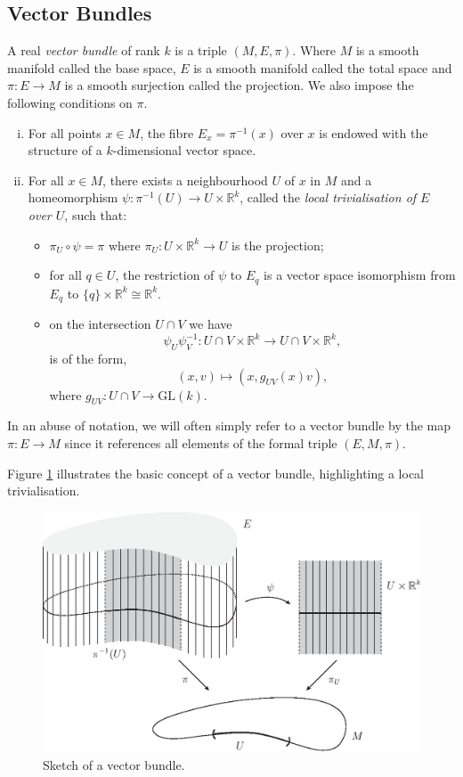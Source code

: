 \subsection{Vector Bundles}
\begin{definition}
A real \textit{vector bundle} of rank $k$ is a triple $(M,E,\pi)$. Where $M$ is a smooth manifold called the base space, $E$ is a smooth manifold called the total space and $\pi:E\to M$ is a smooth surjection called the projection. We also impose the following conditions on $\pi$.
\begin{enumerate}[(i)]
\item For all points $x\in M$, the fibre $E_x=\pi^{-1}(x)$ over $x$ is endowed with the structure of a $k$-dimensional vector space.
\item For all $x\in M$, there exists a neighbourhood $U$ of $x$ in $M$ and a homeomorphism $\psi:\pi^{-1}(U)\to U\times\mathbb{R}^k$, called the \textit{local trivialisation of $E$ over $U$}, such that:
\begin{itemize}
\item $\pi_U\circ\psi=\pi$ where $\pi_U:U\times\mathbb{R}^k\to U$ is the projection;
\item for all $q\in U$, the restriction of $\psi$ to $E_q$ is a vector space isomorphism from $E_q$ to $\{q\}\times\mathbb{R}^k\cong\mathbb{R}^k$.
\item on the intersection $U\cap V$ we have
\[
\psi_U\psi^{-1}_V:U\cap V\times\mathbb{R}^k\to U\cap V\times\mathbb{R}^k,
\]
is of the form,
\[
(x,v)\mapsto\left(x,g_{UV}(x)v\right),
\]
where $g_{UV}:U\cap V\to\mathrm{GL}(k)$.
\end{itemize}
\end{enumerate}
In an abuse of notation, we will often simply refer to a vector bundle by the map $\pi:E\to M$ since it references all elements of the formal triple $(E,M,\pi)$. 
\end{definition}

Figure \ref{fig:bundle-1} illustrates the basic concept of a vector bundle, highlighting a local trivialisation.

\begin{figure}[h!]
\centering
\includegraphics[scale=0.75]{fig/bundle-2b}
\caption{Sketch of a vector bundle.}
\label{fig:bundle-1}
\end{figure}

